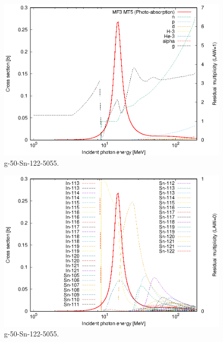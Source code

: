 \begin{figure}
 \includegraphics[width=\linewidth]{eps/g_50-Sn-122_5055.eps}
  \caption{g-50-Sn-122-5055.}
\end{figure}
\begin{figure}
 \includegraphics[width=\linewidth]{eps-law0/g_50-Sn-122_5055.eps}
 \caption{g-50-Sn-122-5055.}
\end{figure}
\newpage \clearpage

